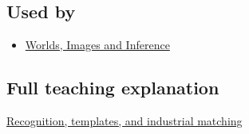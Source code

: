 \subsection{Used by}\label{appendix-5fb4af80d1c7-used-by}

\begin{itemize}
\tightlist
\item
  \href{Continuous\%20Notes/University\%20-\%20Worlds,\%20Images\%20and\%20Inference\%20-\%20Graphics,\%20Vision\%20and\%20Photography}{Worlds, Images and Inference}
\end{itemize}

\subsection{Full teaching explanation}\label{appendix-5fb4af80d1c7-full-teaching-explanation}

\hyperref[04-visual-computing-ii-ch030-recognition-templates-and-industrial-matching]{Recognition, templates, and industrial matching}
